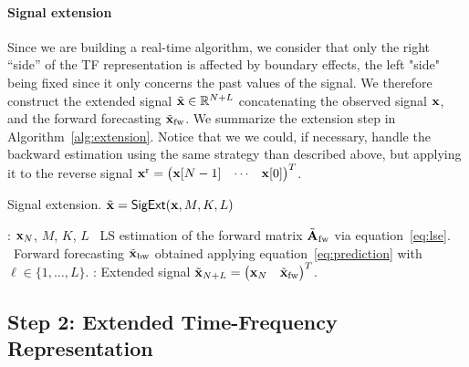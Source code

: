 \paragraph{Signal extension} Since we are building a real-time algorithm, we consider that only the right ``side'' of the TF representation  is affected by boundary effects, the left "side" being fixed since it only concerns the past values of the signal. We therefore construct the extended signal $\tilde{{\mathbf x}}\in{\mathbb R}^{N+L}$ concatenating the observed signal ${\mathbf x}$, and the forward forecasting $\tilde{{\mathbf x}}_{\rm fw}$. We summarize the extension step in Algorithm~\ref{alg:extension}. Notice that we we could, if necessary, handle the backward estimation using the same strategy than described above, but applying it to the reverse signal ${\mathbf x}^{\rm r} = \begin{pmatrix} {\mathbf x}[N-1] & \cdots & {\mathbf x}[0] \end{pmatrix}^T$.

\begin{algorithm}
\caption{Signal extension. $\tilde{{\mathbf x}} = \relax{\sf SigExt}({\mathbf x},M,K,L)$}
\label{alg:extension}
\begin{algorithmic}
: ${\mathbf x}_N$, $M$, $K$, $L$
\STATE 
{}
\STATE \quad\textbullet\ LS estimation of the forward matrix $\tilde{{\mathbf A}}_{\rm fw}$ via equation~\eqref{eq:lse}.
\STATE \quad\textbullet\ Forward forecasting $\tilde{{\mathbf x}}_{\rm bw}$ obtained applying equation~\eqref{eq:prediction} with $\ell\in\{1,\ldots,L\}$.
\STATE 
{}: Extended signal $\tilde{{\mathbf x}}_{N+L} = \begin{pmatrix} {\mathbf x}_N & \tilde{{\mathbf x}}_{\rm fw}\end{pmatrix}^T$. %
\end{algorithmic}
\end{algorithm}

\subsection{Step 2: Extended Time-Frequency Representation}
 
